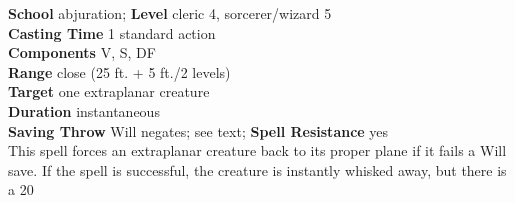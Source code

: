 \textbf{School} abjuration; \textbf{Level} cleric 4, sorcerer/wizard 5\\
\textbf{Casting Time} 1 standard action\\
\textbf{Components} V, S, DF\\
\textbf{Range} close (25 ft. + 5 ft./2 levels)\\
\textbf{Target} one extraplanar creature\\
\textbf{Duration} instantaneous\\
\textbf{Saving Throw }Will negates; see text; \textbf{Spell Resistance} yes\\
This spell forces an extraplanar creature back to its proper plane if it fails a Will save. If the spell is successful, the creature is instantly whisked away, but there is a 20%
